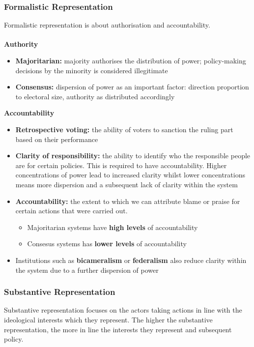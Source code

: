 \documentclass[12pt, letterpaper]{article}
\begin{document}
\subsubsection{Formalistic Representation}
Formalistic representation is about authorisation and accountability.\\\\
\textbf{Authority}
\begin{itemize}
	\item \textbf{Majoritarian:} majority authorises the distribution of power; policy-making decisions by the minority is considered illegitimate
	\item \textbf{Consensus:} dispersion of power as an important factor: direction proportion to electoral size, authority as distributed accordingly
\end{itemize}
\textbf{Accountability}
\begin{itemize}
	\item \textbf{Retrospective voting:} the ability of voters to sanction the ruling part based on their performance
	\item \textbf{Clarity of responsibility:} the ability to identify who the responsible people are for certain policies. This is required to have accountability. Higher concentrations of power lead to increased clarity whilst lower concentrations means more dispersion and a subsequent lack of clarity within the system
	\item \textbf{Accountability:} the extent to which we can attribute blame or praise for certain actions that were carried out.
		\begin{itemize}
			\item Majoritarian systems have \textbf{high levels} of accountability
			\item Consesus systems has \textbf{lower levels} of accountability
		\end{itemize}
	\item Institutions such as \textbf{bicameralism} or \textbf{federalism} also reduce clarity within the system due to a further dispersion of power
\end{itemize}

\subsubsection{Substantive Representation}
Substantive representation focuses on the actors taking actions in line with the ideological interests which they represent. The higher the substantive representation, the more in line the interests they represent and subsequent policy.
\end{document}
